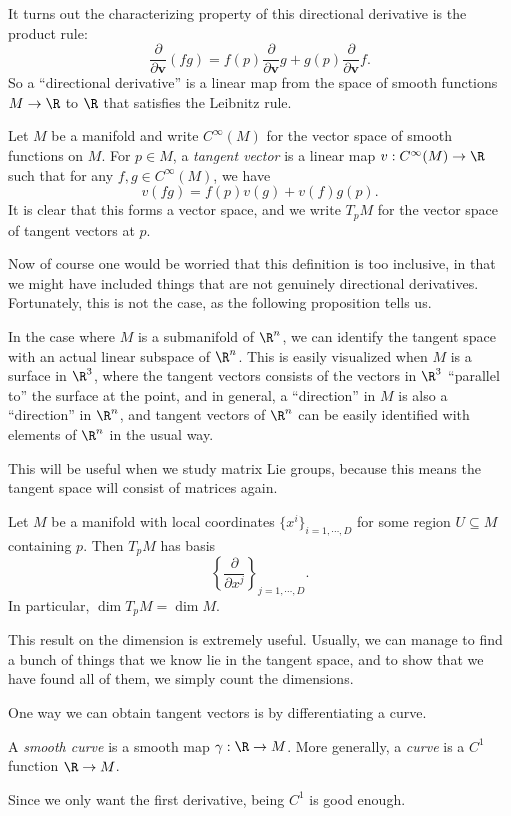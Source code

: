 \documentclass[a4paper]{article}
\begin{document}
It turns out the characterizing property of this directional derivative is the product rule:
\[
  \frac{\partial}{\partial \mathbf{v}}(fg) = f(p) \frac{\partial}{\partial \mathbf{v}} g + g(p) \frac{\partial}{\partial \mathbf{v}}f.
\]
So a ``directional derivative'' is a linear map from the space of smooth functions $M \to \R$ to $\R$ that satisfies the Leibnitz rule.
\begin{defi}
  Let $M$ be a manifold and write $C^\infty(M)$ for the vector space of smooth functions on $M$. For $p \in M$, a \emph{tangent vector} is a linear map $v: C^\infty(M) \to \R$ such that for any $f, g \in C^\infty(M)$, we have
  \[
    v(fg) = f(p) v(g) + v(f) g(p).
  \]
  It is clear that this forms a vector space, and we write $T_p M$ for the vector space of tangent vectors at $p$.
\end{defi}
Now of course one would be worried that this definition is too inclusive, in that we might have included things that are not genuinely directional derivatives. Fortunately, this is not the case, as the following proposition tells us.

In the case where $M$ is a submanifold of $\R^n$, we can identify the tangent space with an actual linear subspace of $\R^n$. This is easily visualized when $M$ is a surface in $\R^3$, where the tangent vectors consists of the vectors in $\R^3$ ``parallel to'' the surface at the point, and in general, a ``direction'' in $M$ is also a ``direction'' in $\R^n$, and tangent vectors of $\R^n$ can be easily identified with elements of $\R^n$ in the usual way.

This will be useful when we study matrix Lie groups, because this means the tangent space will consist of matrices again.
\begin{prop}
  Let $M$ be a manifold with local coordinates $\{x^i\}_{i = 1, \cdots, D}$ for some region $U \subseteq M$ containing $p$. Then $T_p M$ has basis
  \[
    \left\{\frac{\partial}{\partial x^j}\right\}_{j = 1, \cdots, D}.
  \]
  In particular, $\dim T_p M = \dim M$.
\end{prop}
This result on the dimension is extremely useful. Usually, we can manage to find a bunch of things that we know lie in the tangent space, and to show that we have found all of them, we simply count the dimensions.

One way we can obtain tangent vectors is by differentiating a curve.
\begin{defi}
  A \emph{smooth curve} is a smooth map $\gamma: \R \to M$. More generally, a \emph{curve} is a $C^1$ function $\R \to M$.
\end{defi}
Since we only want the first derivative, being $C^1$ is good enough.
\end{document}
